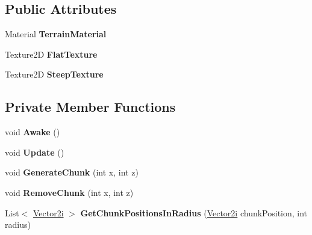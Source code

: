 \subsection*{Public Attributes}
\begin{DoxyCompactItemize}
\item 
\mbox{\label{class_terrain_generator_1_1_terrain_chunk_generator_a8b1aa6d7588ac54f6e52dff3fc3d4220}} 
Material {\bfseries Terrain\+Material}
\item 
\mbox{\label{class_terrain_generator_1_1_terrain_chunk_generator_a525d90982dc67b18f075bcb18c3270d5}} 
Texture2D {\bfseries Flat\+Texture}
\item 
\mbox{\label{class_terrain_generator_1_1_terrain_chunk_generator_a47daa45607273a1805595d1b812debe7}} 
Texture2D {\bfseries Steep\+Texture}
\end{DoxyCompactItemize}
\subsection*{Private Member Functions}
\begin{DoxyCompactItemize}
\item 
\mbox{\label{class_terrain_generator_1_1_terrain_chunk_generator_acbb255d65072f69e86a724ead4592386}} 
void {\bfseries Awake} ()
\item 
\mbox{\label{class_terrain_generator_1_1_terrain_chunk_generator_a8fd6b7a3c116d21c3ba8b34ca727a05d}} 
void {\bfseries Update} ()
\item 
\mbox{\label{class_terrain_generator_1_1_terrain_chunk_generator_a4512f26f1a72e69f3643911878acf051}} 
void {\bfseries Generate\+Chunk} (int x, int z)
\item 
\mbox{\label{class_terrain_generator_1_1_terrain_chunk_generator_a0f763c8a44466700b3b83f5ffa541c1f}} 
void {\bfseries Remove\+Chunk} (int x, int z)
\item 
\mbox{\label{class_terrain_generator_1_1_terrain_chunk_generator_abc65671b8f9a311b205c4b5e0b7ef87f}} 
List$<$ \hyperlink{class_terrain_generator_1_1_vector2i}{Vector2i} $>$ {\bfseries Get\+Chunk\+Positions\+In\+Radius} (\hyperlink{class_terrain_generator_1_1_vector2i}{Vector2i} chunk\+Position, int radius)
\end{DoxyCompactItemize}
